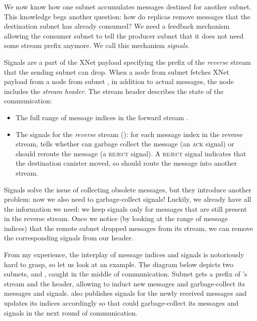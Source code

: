 \documentclass{article}
\begin{document}
We now know how one subnet accumulates messages destined for another subnet.
This knowledge begs another question: how do replicas remove messages that the destination subnet has already consumed?
We need a feedback mechanism allowing the consumer subnet to tell the producer subnet that it does not need some stream prefix anymore.
We call this mechanism \emph{signals}.

Signals are a part of the XNet payload specifying the prefix of the \emph{reverse} stream that the sending subnet can drop.
When a node from subnet  fetches XNet payload from a node from subnet , in addition to actual messages, the  node includes the \emph{stream header}.
The stream header describes the state of the  communication:

\begin{itemize}
  \item
    The full range of message indices in the forward stream .
  \item
    The signals for the \emph{reverse} stream (): for each message index in the reverse stream,  tells whether  can garbage collect the message (an \textsc{ack} signal) or should reroute the message (a \textsc{reject} signal).
    A \textsc{reject} signal indicates that the destination canister moved, so  should route the message into another stream.
\end{itemize}

Signals solve the issue of collecting obsolete messages, but they introduce another problem: now we also need to garbage-collect signals!
Luckily, we already have all the information we need: we keep signals only for messages that are still present in the reverse stream.
Once we notice (by looking at the range of message indices) that the remote subnet dropped messages from its stream, we can remove the corresponding signals from our header.

From my experience, the interplay of message indices and signals is notoriously hard to grasp, so let us look at an example.
The diagram below depicts two subnets,  and , caught in the middle of communication.
Subnet  gets a prefix of 's stream and the header, allowing  to induct new messages and garbage-collect its messages and signals.
 also publishes signals for the newly received messages and updates its indices accordingly so that  could garbage-collect its messages and signals in the next round of communication.
\end{document}
